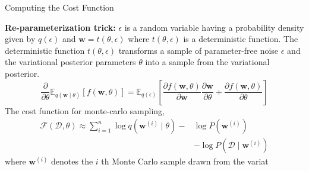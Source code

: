 \documentclass[8pt,xcolor=dvipsnames,compress]{beamer}
\begin{document}
\begin{frame}{Computing the Cost Function}

\textbf{Re-parameterization trick:}
$\epsilon$ is a random variable having a probability density given by $q(\epsilon)$ and $\mathbf{w}=t(\theta, \epsilon)$ where $t(\theta, \epsilon)$ is a deterministic function. The deterministic function $t(\theta, \epsilon)$ transforms a sample of parameter-free noise $\epsilon$ and the variational posterior parameters $\theta$ into a sample from the variational posterior. 
\begin{equation}
\frac{\partial}{\partial \theta} \mathbb{E}_{q(\mathbf{w} \mid \theta)}[f(\mathbf{w}, \theta)]=\mathbb{E}_{q(\epsilon)}\left[\frac{\partial f(\mathbf{w}, \theta)}{\partial \mathbf{w}} \frac{\partial \mathbf{w}}{\partial \theta}+\frac{\partial f(\mathbf{w}, \theta)}{\partial \theta}\right]
\end{equation}
The cost function for monte-carlo sampling,
\begin{equation}
\begin{aligned}
\mathcal{F}(\mathcal{D}, \theta) \approx \sum_{i=1}^{n} \log q\left(\mathbf{w}^{(i)} \mid \theta\right)- & \log P\left(\mathbf{w}^{(i)}\right) \\
& -\log P\left(\mathcal{D} \mid \mathbf{w}^{(i)}\right)
\end{aligned}
\end{equation}
where $\mathbf{w}^{(i)}$ denotes the $i$ th Monte Carlo sample drawn from the variat
\end{frame}
\end{document}
